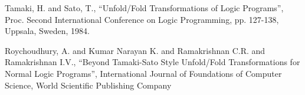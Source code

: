   \begin{thebibliography}{1}


    Tamaki, H. and Sato, T.,
    ``Unfold/Fold Transformations of Logic Programs'',
    Proc. Second International Conference on Logic Programming,
    pp. 127-138,
    Uppsala, Sweden, 1984.


    Roychoudhury, A. and Kumar Narayan K. and Ramakrishnan C.R. and Ramakrishnan I.V.,
    ``Beyond Tamaki-Sato Style Unfold/Fold Transformations for Normal Logic Programs'',
    International Journal of Foundations of Computer Science,
    World Scientific Publishing Company


  \end{thebibliography}


